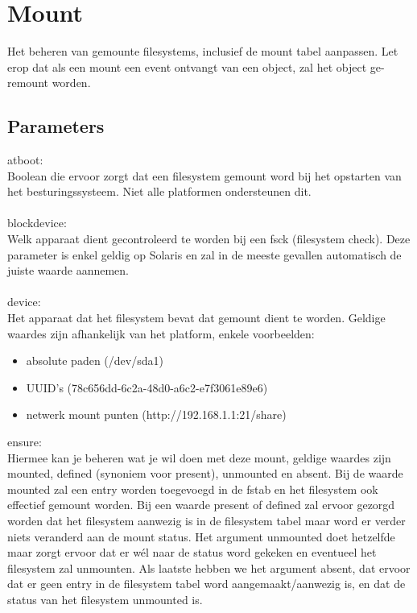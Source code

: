 \section{Mount}

Het beheren van gemounte filesystems, inclusief de mount tabel aanpassen. Let erop dat als een mount een event ontvangt van een object, zal het object ge-remount worden.

\subsection{Parameters}

atboot:\\
Boolean die ervoor zorgt dat een filesystem gemount word bij het opstarten van het besturingssysteem. Niet alle platformen ondersteunen dit.\\\\
%
blockdevice:\\
Welk apparaat dient gecontroleerd te worden bij een fsck (filesystem check). Deze parameter is enkel geldig op Solaris en zal in de meeste gevallen automatisch de juiste waarde aannemen.\\\\
%
device:\\
Het apparaat dat het filesystem bevat dat gemount dient te worden. Geldige waardes zijn afhankelijk van het platform, enkele voorbeelden:
\begin{itemize}
\item absolute paden (/dev/sda1)
\item UUID's (78c656dd-6c2a-48d0-a6c2-e7f3061e89e6)
\item netwerk mount punten (http://192.168.1.1:21/share)
\end{itemize}
%
ensure:\\
Hiermee kan je beheren wat je wil doen met deze mount, geldige waardes zijn mounted, defined (synoniem voor present), unmounted en absent. Bij de waarde mounted zal een entry worden toegevoegd in de fstab en het filesystem ook effectief gemount worden. Bij een waarde present of defined zal ervoor gezorgd worden dat het filesystem aanwezig is in de filesystem tabel maar word er verder niets veranderd aan de mount status. Het argument unmounted doet hetzelfde maar zorgt ervoor dat er w\'el naar de status word gekeken en eventueel het filesystem zal unmounten. Als laatste hebben we het argument absent, dat ervoor dat er geen entry in de filesystem tabel word aangemaakt/aanwezig is, en dat de status van het filesystem unmounted is.\\\\
